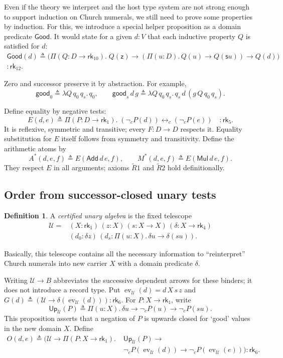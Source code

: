 \documentclass{article}
\theoremstyle{definition}
\newtheorem{definition}{Definition}
\theoremstyle{remark}
\newcommand{\rk}[1]{\mathsf{rk}_{#1}}
\newcommand{\Good}{\mathsf{Good}}
\newcommand{\ev}{\operatorname{ev}}
\newcommand{\Add}{\mathsf{Add}}
\newcommand{\Mul}{\mathsf{Mul}}
\newcommand{\z}{\mathsf z}
\newcommand{\suc}{\mathsf s}
\newcommand{\nc}{\mathop{\neg}\nolimits_c}
\newcommand{\iffc}{\mathbin{\leftrightarrow_c}}
\newcommand{\Up}{\mathsf{Up}}
\begin{document}
Even if the theory we interpret and the host type
system are not strong enough to support induction on
Church numerals, we still need to prove some properties
by induction. For this, we introduce a special helper
proposition as a domain predicate $\Good$. It would
state for a given $d:V$ that each inductive property
$Q$ is satisfied for $d$:
\begin{multline*}
    \Good(d)\triangleq\bigl(\Pi(Q:D\to\rk{10}).\;
    Q(\z)\to(\Pi(u:D).\,Q(u)\to Q(\suc u))\to
    Q(d)\bigr)\\:\rk{12}.
\end{multline*}

Zero and successor preserve it by abstraction. For
example,
\[
    \mathsf{good}_0\triangleq\lambda Q\,q_0\,q_s.
        \,q_0,\qquad
    \mathsf{good}_s\,d\,g\triangleq
        \lambda Q\,q_0\,q_s.\,
        q_s\,d\,(g\,Q\,q_0\,q_s).
\]

Define equality by negative tests:
\[
    E(d,e)\triangleq\Pi(P:D\to\rk1).\;
    (\nc P(d))\iffc(\nc P(e))\quad:\rk5.
\]
It is reflexive, symmetric and transitive; every
$F:D\to D$ respects it. Equality substitution for $E$
itself follows from symmetry and transitivity. Define
the arithmetic atoms by
\[
    A^*(d,e,f)\triangleq E(\Add\,d\,e,f),\qquad
    M^*(d,e,f)\triangleq E(\Mul\,d\,e,f).
\]
They respect $E$ in all arguments; axioms
$\widetilde R1$ and $\widetilde R2$ hold
definitionally.

\subsection{Order from successor-closed unary tests}

\begin{definition}
    A \emph{certified unary algebra} is the fixed
    telescope
    \[
        \begin{aligned}
            \mathcal U={}&(X:\rk1)\,(z:X)\,
            (s:X\to X)\,(\delta:X\to\rk4)\\
            &(d_0:\delta z)\,
            (d_s:\Pi(u:X).\,\delta u\to\delta(su)).
        \end{aligned}
    \]
\end{definition}

Basically, this telescope contains all the necessary
information to ``reinterpret'' Church numerals into new
carrier $X$ with a domain predicate $\delta$.

Writing $\mathcal U\to B$ abbreviates the successive
dependent arrows for these binders; it does not
introduce a record type. Put
$\ev_{\mathcal U}(d)=d\,X\,s\,z$ and
$G(d)\triangleq(\mathcal U\to\delta(\ev_{
\mathcal U}(d))):\rk6$. For $P:X\to\rk1$, write
\[
    \Up_{\mathcal U}(P)\triangleq
    \Pi(u:X).\,\delta u\to\nc P(u)\to\nc P(su).
\]
This proposition asserts that a negation of $P$ is
upwards closed for `good' values in the new domain $X$.
Define
\[
    \begin{aligned}
        O(d,e)\triangleq\bigl(
        \mathcal U\to\Pi(P:X\to\rk1).\;&
        \Up_{\mathcal U}(P)\to{}\\
        &\nc P(\ev_{\mathcal U}(d))\to\nc P(\ev_{
            \mathcal U}(e))\bigr):\rk6.
    \end{aligned}
\]
\end{document}
